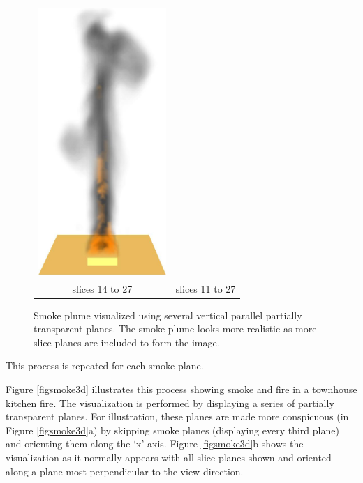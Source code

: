 \begin{figure}[\figoptions]
\begin{center}
\begin{tabular}{cc}
\includegraphics[height=4.0in]{figures/splume_11_27}\\
slices 14 to 27&slices 11 to 27
\end{tabular}
\end{center}
\caption [Smoke plume visualized using several vertical parallel
partially transparent planes.] {Smoke plume visualized using
several vertical parallel partially transparent planes. The smoke
plume looks more realistic as more slice planes
are included to form the image. } \label{figplume}
\end{figure}

\noindent This process is repeated for each smoke plane.

Figure \ref{figsmoke3d} illustrates this process showing smoke and fire in a townhouse kitchen fire. The visualization is performed by displaying a series of partially transparent planes. For illustration, these planes are made more conspicuous (in Figure \ref{figsmoke3d}a) by skipping smoke planes (displaying every third plane) and orienting them along the `x' axis. Figure \ref{figsmoke3d}b shows the visualization as it normally appears with all slice planes shown and oriented along a
plane most perpendicular to the view direction.

